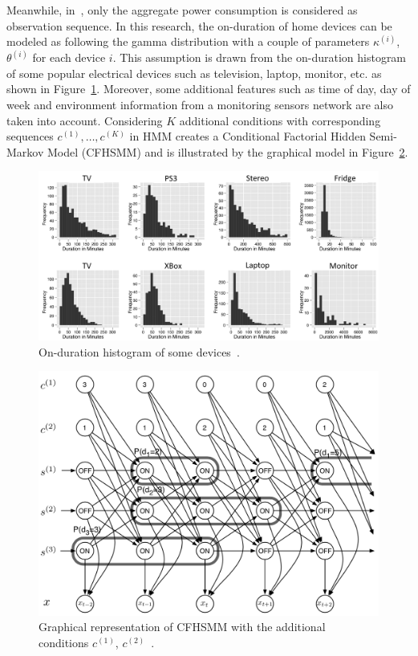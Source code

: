 Meanwhile, in~\cite{Kim11ICDM}, only the aggregate power consumption is considered as observation sequence. In this research, the on-duration of home devices can be modeled as following the gamma distribution with a couple of parameters $\kappa^{(i)}$, $\theta^{(i)}$ for each device $i$. This assumption is drawn from the on-duration histogram of some popular electrical devices such as television, laptop, monitor, etc. as shown in Figure~\ref{fig:AA12}. Moreover, some additional features such as time of day, day of week and environment information from a monitoring sensors network are also taken into account. Considering $K$ additional conditions with corresponding sequences $c^{(1)}, \ldots, c^{(K)}$ in HMM creates a Conditional Factorial Hidden Semi-Markov Model (CFHSMM) and is illustrated by the graphical model in Figure~\ref{fig:A12}. 

\begin{figure}
\centering
\includegraphics[width=1\textwidth]{./chapters/chapter2/images/on-duration_gamma.pdf} 
\caption{On-duration histogram of some devices~\cite{Kim11ICDM}.} 
\label{fig:AA12} 
\end{figure}

\begin{figure}
\centering
\includegraphics[width=.8\textwidth]{./chapters/chapter2/images/CFHSMM.pdf} 
\caption{Graphical representation of CFHSMM with the additional conditions $c^{(1)}$, $c^{(2)}$~\cite{Kim11ICDM}.} 
\label{fig:A12} 
\end{figure}

